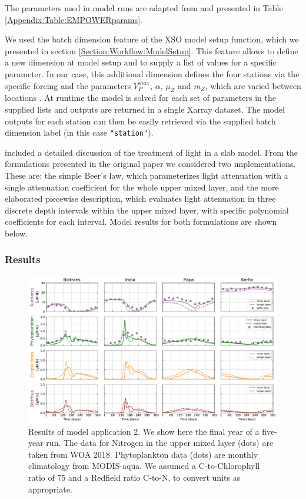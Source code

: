 \documentclass[journal abbreviation, manuscript]{copernicus}
\begin{document}
The parameters used in model runs are adapted from \citet{Anderson2015c} and presented in Table \ref{Appendix:Table:EMPOWERparams}.

We used the batch dimension feature of the XSO model setup function, which we presented in section \ref{Section:Workflow:ModelSetup}. This feature allows to define a new dimension at model setup and to supply a list of values for a specific parameter. In our case, this additional dimension defines the four stations via the specific forcing and the parameters $V_P^{max}$, $\alpha$, $\mu_Z$ and $m_Z$, which are varied between locations \citep{Anderson2015c}. At runtime the model is solved for each set of parameters in the supplied lists and outputs are returned in a single Xarray dataset. The model outputs for each station can then be easily retrieved via the supplied batch dimension label (in this case \texttt{"station"}).

\citet{Anderson2015c} included a detailed discussion of the treatment of light in a slab model. From the formulations presented in the original paper we considered two implementations. These are: the simple Beer's law, which parameterizes light attenuation with a single attenuation coefficient for the whole upper mixed layer, and the more elaborated piecewise description, which evaluates light attenuation in three discrete depth intervals within the upper mixed layer, with specific polynomial coefficients for each interval. Model results for both formulations are shown below.

\subsubsection{Results}
\begin{figure}[t]
\includegraphics[width=15cm]{Figures/firstdraft_plots/02_EMPOWER_lightcomp.pdf}
\caption{Results of model application 2. We show here the final year of a five-year run. The data for Nitrogen in the upper mixed layer (dots) are taken from WOA 2018. Phytoplankton data (dots) are monthly climatology from MODIS-aqua. We assumed a C-to-Chlorophyll ratio of 75 and a Redfield ratio C-to-N, to convert units as appropriate.}
\label{Figure:ResultsEMPOWER}
\end{figure}
\end{document}
